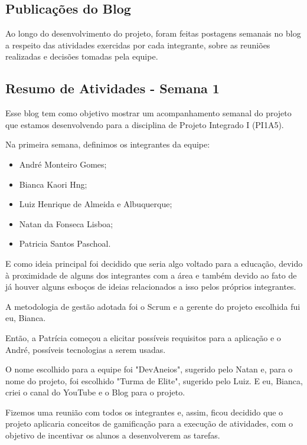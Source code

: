 \begin{apendicesenv}
\chapter{Publicações do Blog}

Ao longo do desenvolvimento do projeto, foram feitas postagens semanais no blog a respeito das atividades exercidas por cada integrante, sobre as reuniões realizadas e decisões tomadas pela equipe.

\section{Resumo de Atividades - Semana 1}

Esse blog tem como objetivo mostrar um acompanhamento semanal do projeto que estamos desenvolvendo para a disciplina de Projeto Integrado I (PI1A5).

Na primeira semana, definimos os integrantes da equipe:

\begin{itemize}
\item André Monteiro Gomes;
\item Bianca Kaori Hng;
\item Luiz Henrique de Almeida e Albuquerque;
\item Natan da Fonseca Lisboa;
\item Patricia Santos Paschoal.
\end{itemize}

E como ideia principal foi decidido que seria algo voltado para a educação, devido à proximidade de alguns dos integrantes com a área e também devido ao fato de já houver alguns esboços de ideias relacionados a isso pelos próprios integrantes. 

A metodologia de gestão adotada foi o Scrum e a gerente do projeto escolhida fui eu, Bianca.

Então, a Patrícia começou a elicitar possíveis requisitos para a aplicação e o André, possíveis tecnologias a serem usadas.

O nome escolhido para a equipe foi "DevAneios", sugerido pelo Natan e, para o nome do projeto, foi escolhido "Turma de Elite", sugerido pelo Luiz. E eu, Bianca, criei o canal do YouTube e o Blog para o projeto.

Fizemos uma reunião com todos os integrantes e, assim, ficou decidido que o projeto aplicaria conceitos de gamificação para a execução de atividades, com o objetivo de incentivar os alunos a desenvolverem as tarefas.



\end{apendicesenv}
